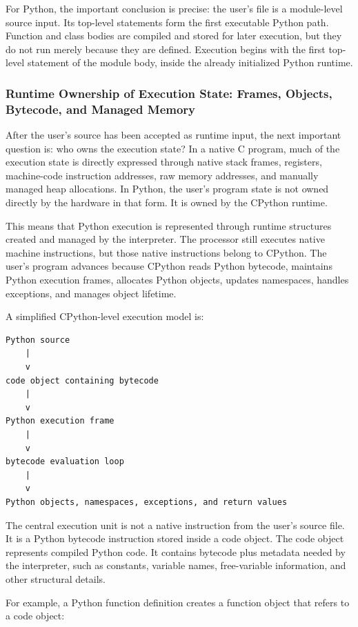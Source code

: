 For Python, the important conclusion is precise: the user's file is a module-level source input. Its top-level statements form the first executable Python path. Function and class bodies are compiled and stored for later execution, but they do not run merely because they are defined. Execution begins with the first top-level statement of the module body, inside the already initialized Python runtime.



\subsubsection{Runtime Ownership of Execution State: Frames, Objects, Bytecode, and Managed Memory}

After the user's source has been accepted as runtime input, the next important question is: who owns the execution state? In a native C program, much of the execution state is directly expressed through native stack frames, registers, machine-code instruction addresses, raw memory addresses, and manually managed heap allocations. In Python, the user's program state is not owned directly by the hardware in that form. It is owned by the CPython runtime.

This means that Python execution is represented through runtime structures created and managed by the interpreter. The processor still executes native machine instructions, but those native instructions belong to CPython. The user's program advances because CPython reads Python bytecode, maintains Python execution frames, allocates Python objects, updates namespaces, handles exceptions, and manages object lifetime.

A simplified CPython-level execution model is:

\begin{verbatim}
Python source
    |
    v
code object containing bytecode
    |
    v
Python execution frame
    |
    v
bytecode evaluation loop
    |
    v
Python objects, namespaces, exceptions, and return values
\end{verbatim}

The central execution unit is not a native instruction from the user's source file. It is a Python bytecode instruction stored inside a code object. The code object represents compiled Python code. It contains bytecode plus metadata needed by the interpreter, such as constants, variable names, free-variable information, and other structural details.

For example, a Python function definition creates a function object that refers to a code object:

